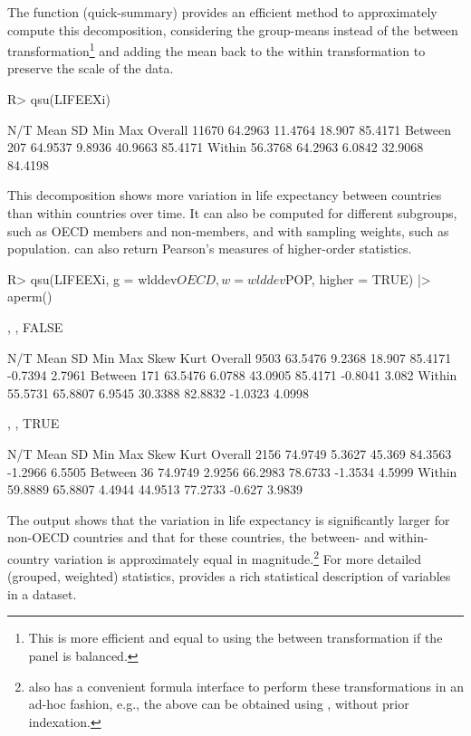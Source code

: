 \documentclass[nojss]{jss} %
\newcommand{\fct}[1]{\code{#1()}}
\begin{document}
%
The function \fct{qsu} (quick-summary) provides an efficient method to approximately compute this decomposition, considering the group-means instead of the between transformation\footnote{This is more efficient and equal to using the between transformation if the panel is balanced.} and adding the mean back to the within transformation to preserve the scale of the data.
%
\begin{Schunk}
\begin{Sinput}
R> qsu(LIFEEXi)
\end{Sinput}
\begin{Soutput}
             N/T     Mean       SD      Min      Max
Overall    11670  64.2963  11.4764   18.907  85.4171
Between      207  64.9537   9.8936  40.9663  85.4171
Within   56.3768  64.2963   6.0842  32.9068  84.4198
\end{Soutput}
\end{Schunk}
%
This decomposition shows more variation in life expectancy between countries than within countries over time. It can also be computed for different subgroups, such as OECD members and non-members, and with sampling weights, such as population. \fct{qsu} can also return Pearson's measures of higher-order statistics.
%
\begin{Schunk}
\begin{Sinput}
R> qsu(LIFEEXi, g = wlddev$OECD, w = wlddev$POP, higher = TRUE) |> aperm()
\end{Sinput}
\begin{Soutput}
, , FALSE

             N/T     Mean      SD      Min      Max     Skew    Kurt
Overall     9503  63.5476  9.2368   18.907  85.4171  -0.7394  2.7961
Between      171  63.5476  6.0788  43.0905  85.4171  -0.8041   3.082
Within   55.5731  65.8807  6.9545  30.3388  82.8832  -1.0323  4.0998

, , TRUE

             N/T     Mean      SD      Min      Max     Skew    Kurt
Overall     2156  74.9749  5.3627   45.369  84.3563  -1.2966  6.5505
Between       36  74.9749  2.9256  66.2983  78.6733  -1.3534  4.5999
Within   59.8889  65.8807  4.4944  44.9513  77.2733   -0.627  3.9839
\end{Soutput}
\end{Schunk}
%
The output shows that the variation in life expectancy is significantly larger for non-OECD countries and that for these countries, the between- and within-country variation is approximately equal in magnitude.\footnote{\fct{qsu} also has a convenient formula interface to perform these transformations in an ad-hoc fashion, e.g., the above can be obtained using , without prior indexation.} For more detailed (grouped, weighted) statistics, \fct{descr} provides a rich statistical description of variables in a dataset.
\end{document}
